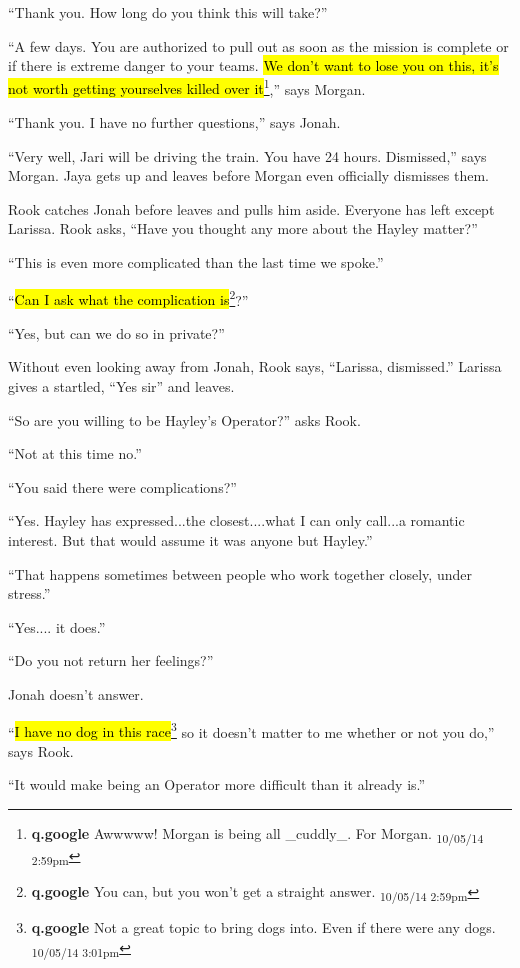 ``Thank you.  How long do you think this will take?''

``A few days.  You are authorized to pull out as soon as the mission is complete or if there is extreme danger to your teams.  \hl{We don't want to lose you on this, it's not worth getting yourselves killed over it}\footnote{\textbf{q.google }Awwwww!  Morgan is being all \_cuddly\_.  For Morgan. \textsubscript{10/05/14 2:59pm}},'' says Morgan.

``Thank you.  I have no further questions,'' says Jonah.

``Very well, Jari will be driving the train.  You have 24 hours.  Dismissed,'' says Morgan.  Jaya gets up and leaves before Morgan even officially dismisses them.



Rook catches Jonah before leaves and pulls him aside.  Everyone has left except Larissa.  Rook asks, ``Have you thought any more about the Hayley matter?''

``This is even more complicated than the last time we spoke.''

``\hl{Can I ask what the complication is}\footnote{\textbf{q.google }You can, but you won't get a straight answer. \textsubscript{10/05/14 2:59pm}}?''

``Yes, but can we do so in private?''

Without even looking away from Jonah, Rook says, ``Larissa, dismissed.''  Larissa gives a startled, ``Yes sir'' and leaves.

``So are you willing to be Hayley's Operator?'' asks Rook.

``Not at this time no.''

``You said there were complications?''

``Yes.  Hayley has expressed...the closest....what I can only call...a romantic interest.  But that would assume it was anyone but Hayley.''

``That happens sometimes between people who work together closely, under stress.''

``Yes.... it does.''

``Do you not return her feelings?''

Jonah doesn't answer.

``\hl{I have no dog in this race}\footnote{\textbf{q.google }Not a great topic to bring dogs into.  Even if there were any dogs. \textsubscript{10/05/14 3:01pm}} so it doesn't matter to me whether or not you do,'' says Rook.

``It would make being an Operator more difficult than it already is.''

